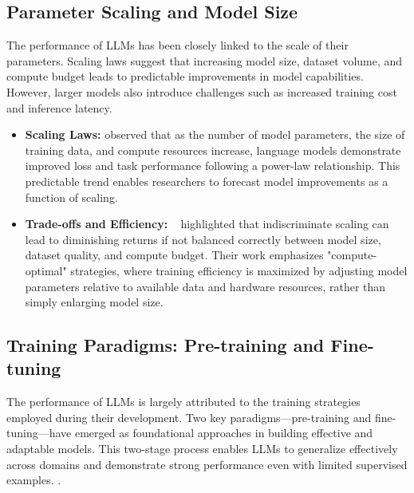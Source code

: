 \subsection{Parameter Scaling and Model Size}
The performance of LLMs has been closely linked to the scale of their parameters. Scaling laws \citep{kaplan2020scaling} suggest that increasing model size, dataset volume, and compute budget leads to predictable improvements in model capabilities. However, larger models also introduce challenges such as increased training cost and inference latency.

\begin{itemize}
	\item \textbf{Scaling Laws:} \citep{kaplan2020scaling} observed that as the number of model parameters, the size of training data, and compute resources increase, language models demonstrate improved loss and task performance following a power-law relationship. This predictable trend enables researchers to forecast model improvements as a function of scaling.
		
	\item \textbf{Trade-offs and Efficiency:} ~\citep{hoffmann2022training} highlighted that indiscriminate scaling can lead to diminishing returns if not balanced correctly between model size, dataset quality, and compute budget. Their work emphasizes "compute-optimal" strategies, where training efficiency is maximized by adjusting model parameters relative to available data and hardware resources, rather than simply enlarging model size.
	
\end{itemize}
\subsection{Training Paradigms: Pre-training and Fine-tuning}
The performance of LLMs is largely attributed to the training strategies employed during their development. Two key paradigms—pre-training and fine-tuning—have emerged as foundational approaches in building effective and adaptable models. This two-stage process enables LLMs to generalize effectively across domains and demonstrate strong performance even with limited supervised examples.
 .
